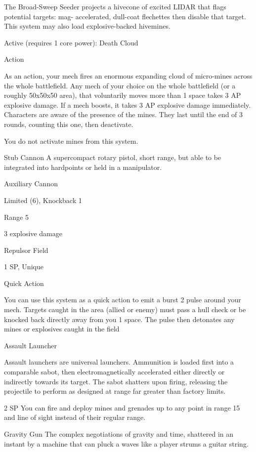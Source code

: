 The Broad-Sweep Seeder projects a hivecone of excited LIDAR that flags potential targets: mag-
 accelerated, dull-coat flechettes then disable that target. This system may also load explosive-backed
 hivemines.

 Active (requires 1 core power): Death Cloud

 Action

 As an action, your mech fires an enormous expanding cloud of micro-mines across the whole
 battlefield. Any mech of your choice on the whole battlefield (or a roughly 50x50x50 area), that
 voluntarily moves more than 1 space takes 3 AP explosive damage. If a mech boosts, it takes 3 AP
 explosive damage immediately. Characters are aware of the presence of the mines. They last until the
 end of 3 rounds, counting this one, then deactivate.

 You do not activate mines from this system.

Stub Cannon
A supercompact rotary pistol, short range, but able to be integrated into hardpoints or held in a
manipulator.

Auxiliary Cannon

Limited (6), Knockback 1

Range 5

3 explosive damage

Repulsor Field


1 SP, Unique


Quick Action

You can use this system as a quick action to emit a burst 2 pulse around your mech. Targets
caught in the area (allied or enemy) must pass a hull check or be knocked back directly away
from you 1 space. The pulse then detonates any mines or explosives caught in the field


Assault Launcher

Assault launchers are universal launchers. Ammunition is loaded first into a comparable sabot, then
electromagnetically accelerated either directly or indirectly towards its target. The sabot shatters upon
firing, releasing the projectile to perform as designed at range far greater than factory limits.

2 SP
You can fire and deploy mines and grenades up to any point in range 15 and line of sight instead
of their regular range.





Gravity Gun
The complex negotiations of gravity and time, shattered in an instant by a machine that can pluck
a waves like a player strums a guitar string.

